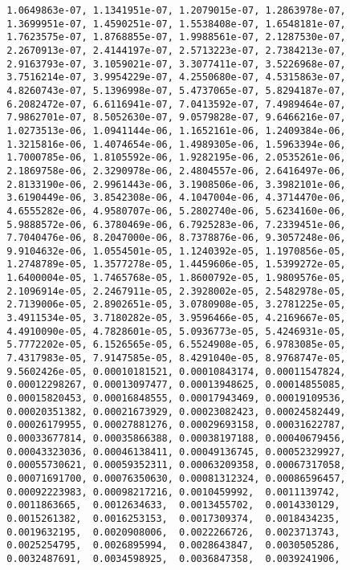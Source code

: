 \begin{Verbatim}
  1.0649863e-07, 1.1341951e-07, 1.2079015e-07, 1.2863978e-07,
  1.3699951e-07, 1.4590251e-07, 1.5538408e-07, 1.6548181e-07,
  1.7623575e-07, 1.8768855e-07, 1.9988561e-07, 2.1287530e-07,
  2.2670913e-07, 2.4144197e-07, 2.5713223e-07, 2.7384213e-07,
  2.9163793e-07, 3.1059021e-07, 3.3077411e-07, 3.5226968e-07,
  3.7516214e-07, 3.9954229e-07, 4.2550680e-07, 4.5315863e-07,
  4.8260743e-07, 5.1396998e-07, 5.4737065e-07, 5.8294187e-07,
  6.2082472e-07, 6.6116941e-07, 7.0413592e-07, 7.4989464e-07,
  7.9862701e-07, 8.5052630e-07, 9.0579828e-07, 9.6466216e-07,
  1.0273513e-06, 1.0941144e-06, 1.1652161e-06, 1.2409384e-06,
  1.3215816e-06, 1.4074654e-06, 1.4989305e-06, 1.5963394e-06,
  1.7000785e-06, 1.8105592e-06, 1.9282195e-06, 2.0535261e-06,
  2.1869758e-06, 2.3290978e-06, 2.4804557e-06, 2.6416497e-06,
  2.8133190e-06, 2.9961443e-06, 3.1908506e-06, 3.3982101e-06,
  3.6190449e-06, 3.8542308e-06, 4.1047004e-06, 4.3714470e-06,
  4.6555282e-06, 4.9580707e-06, 5.2802740e-06, 5.6234160e-06,
  5.9888572e-06, 6.3780469e-06, 6.7925283e-06, 7.2339451e-06,
  7.7040476e-06, 8.2047000e-06, 8.7378876e-06, 9.3057248e-06,
  9.9104632e-06, 1.0554501e-05, 1.1240392e-05, 1.1970856e-05,
  1.2748789e-05, 1.3577278e-05, 1.4459606e-05, 1.5399272e-05,
  1.6400004e-05, 1.7465768e-05, 1.8600792e-05, 1.9809576e-05,
  2.1096914e-05, 2.2467911e-05, 2.3928002e-05, 2.5482978e-05,
  2.7139006e-05, 2.8902651e-05, 3.0780908e-05, 3.2781225e-05,
  3.4911534e-05, 3.7180282e-05, 3.9596466e-05, 4.2169667e-05,
  4.4910090e-05, 4.7828601e-05, 5.0936773e-05, 5.4246931e-05,
  5.7772202e-05, 6.1526565e-05, 6.5524908e-05, 6.9783085e-05,
  7.4317983e-05, 7.9147585e-05, 8.4291040e-05, 8.9768747e-05,
  9.5602426e-05, 0.00010181521, 0.00010843174, 0.00011547824,
  0.00012298267, 0.00013097477, 0.00013948625, 0.00014855085,
  0.00015820453, 0.00016848555, 0.00017943469, 0.00019109536,
  0.00020351382, 0.00021673929, 0.00023082423, 0.00024582449,
  0.00026179955, 0.00027881276, 0.00029693158, 0.00031622787,
  0.00033677814, 0.00035866388, 0.00038197188, 0.00040679456,
  0.00043323036, 0.00046138411, 0.00049136745, 0.00052329927,
  0.00055730621, 0.00059352311, 0.00063209358, 0.00067317058,
  0.00071691700, 0.00076350630, 0.00081312324, 0.00086596457,
  0.00092223983, 0.00098217216, 0.0010459992,  0.0011139742,
  0.0011863665,  0.0012634633,  0.0013455702,  0.0014330129,
  0.0015261382,  0.0016253153,  0.0017309374,  0.0018434235,
  0.0019632195,  0.0020908006,  0.0022266726,  0.0023713743,
  0.0025254795,  0.0026895994,  0.0028643847,  0.0030505286,
  0.0032487691,  0.0034598925,  0.0036847358,  0.0039241906,

\end{Verbatim}
